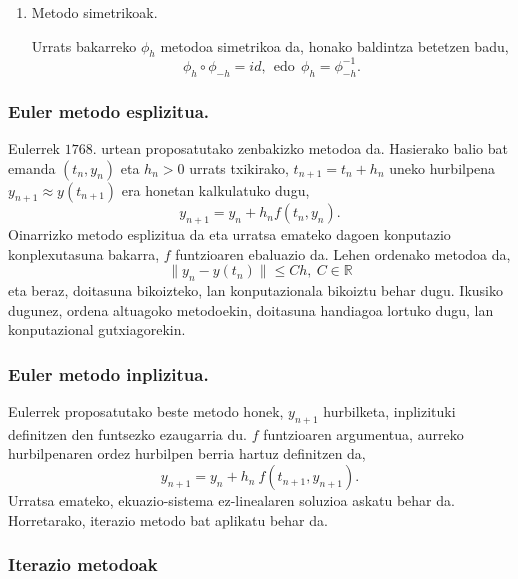 \begin{enumerate}
\begin{enumerate}
\end{enumerate}

\item  Metodo simetrikoak.

Urrats bakarreko $\phi_h$ metodoa simetrikoa da, honako baldintza betetzen badu,
\begin{equation*}
\phi_h \circ \phi_{-h}=id,  \ \ \text{edo} \ \ \phi_h=\phi_{-h}^{-1}.
\end{equation*}


\end{enumerate}


\subsubsection*{Euler metodo esplizitua.}

Eulerrek $1768.$ urtean proposatutako zenbakizko metodoa da. Hasierako balio bat emanda $(t_n,y_n)$ eta $h_n>0$ urrats txikirako, $t_{n+1}=t_{n}+h_{n}$ uneko hurbilpena $y_ {n+1} \approx y(t_{n+1})$ era honetan kalkulatuko dugu,  
\begin{equation*}
 \label{eq:202a}
y_{n+1}=y_{n}+h_n f(t_n,y_n).
\end{equation*}
Oinarrizko metodo esplizitua da eta urratsa emateko dagoen konputazio konplexutasuna bakarra, $f$ funtzioaren ebaluazio da. Lehen ordenako metodoa da,
\begin{equation*}
\|y_n-y(t_n)\| \leqslant C h, \ C \in \mathbb{R}
\end{equation*}
eta beraz, doitasuna bikoizteko, lan konputazionala bikoiztu behar dugu. Ikusiko dugunez, ordena altuagoko metodoekin, doitasuna handiagoa lortuko dugu, lan konputazional gutxiagorekin. 

\subsubsection*{Euler metodo inplizitua.}

Eulerrek proposatutako beste metodo honek, $y_{n+1}$ hurbilketa, inplizituki definitzen den funtsezko ezaugarria du. $f$ funtzioaren argumentua, aurreko hurbilpenaren ordez hurbilpen berria hartuz definitzen da,
\begin{equation*}
 \label{eq:202b}
y_{n+1}=y_{n}+h_n \ f(t_{n+1},y_{n+1}).
\end{equation*}
Urratsa emateko, ekuazio-sistema ez-linealaren soluzioa askatu behar da. Horretarako, iterazio metodo bat aplikatu behar da.

\subsubsection*{Iterazio metodoak}

